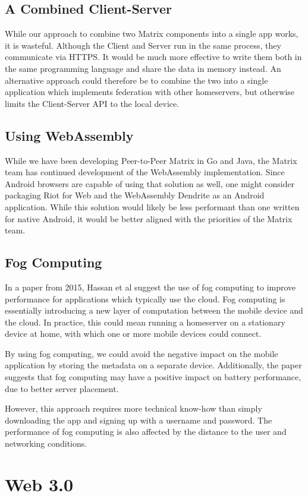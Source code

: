 \subsection{A Combined Client-Server}\label{subsec:combined_client_server}
While our approach to combine two Matrix components into a single app works, it is wasteful.
Although the Client and Server run in the same process, they communicate via HTTPS\@.
It would be much more effective to write them both in the same programming language and share the data in memory instead.
An alternative approach could therefore be to combine the two into a single application which implements federation with other homeservers, but otherwise limits the Client-Server API to the local device.

\subsection{Using WebAssembly}\label{subsec:using_webassembly}
While we have been developing Peer-to-Peer Matrix in Go and Java, the Matrix team has continued development of the WebAssembly implementation.
Since Android browsers are capable of using that solution as well, one might consider packaging Riot for Web and the WebAssembly Dendrite as an Android application.
While this solution would likely be less performant than one written for native Android, it would be better aligned with the priorities of the Matrix team.

\subsection{Fog Computing}\label{sec:fog_computing}
In a paper from 2015, Hassan et al suggest the use of fog computing to improve performance for applications which typically use the cloud\cite{hassan2015help}.
Fog computing is essentially introducing a new layer of computation between the mobile device and the cloud.
In practice, this could mean running a homeserver on a stationary device at home, with which one or more mobile devices could connect.

By using fog computing, we could avoid the negative impact on the mobile application by storing the metadata on a separate device.
Additionally, the paper suggests that fog computing may have a positive impact on battery performance, due to better server placement.

However, this approach requires more technical know-how than simply downloading the app and signing up with a username and password.
The performance of fog computing is also affected by the distance to the user and networking conditions.

\section{Web 3.0}\label{sec:web_3pt0}
